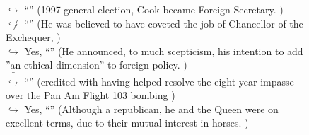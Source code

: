 \documentclass[11pt,a4paper, onecolumn]{article}
\begin{document}
\begin{figure}[t] \small \begin{tcolorbox}[boxsep=0pt,left=5pt,right=0pt,top=2pt,colback = yellow!5] \begin{dialogue}
 \small 
\colorbox{pink!25}{$\hookrightarrow$}
{ ``'' (1997 general election, Cook became Foreign Secretary. ) }
\\
\colorbox{pink!25}{$\not\hookrightarrow$}
{ ``'' (He was believed to have coveted the job of Chancellor of the Exchequer, ) }
\\
\colorbox{pink!25}{$\hookrightarrow$}
\colorbox{red!25}{Yes,}
{ ``'' (He announced, to much scepticism, his intention to add ''an ethical dimension'' to foreign policy. ) }
\\
\colorbox{pink!25}{ $\bar{\hookrightarrow}$}
{ ``'' (credited with having helped resolve the eight-year impasse over the Pan Am Flight 103 bombing ) }
\\
\colorbox{pink!25}{$\hookrightarrow$}
\colorbox{red!25}{Yes,}
{ ``'' (Although a republican, he and the Queen were on excellent terms, due to their mutual interest in horses. ) }
\\
 \end{dialogue}\end{tcolorbox}\end{figure}
\end{document}
